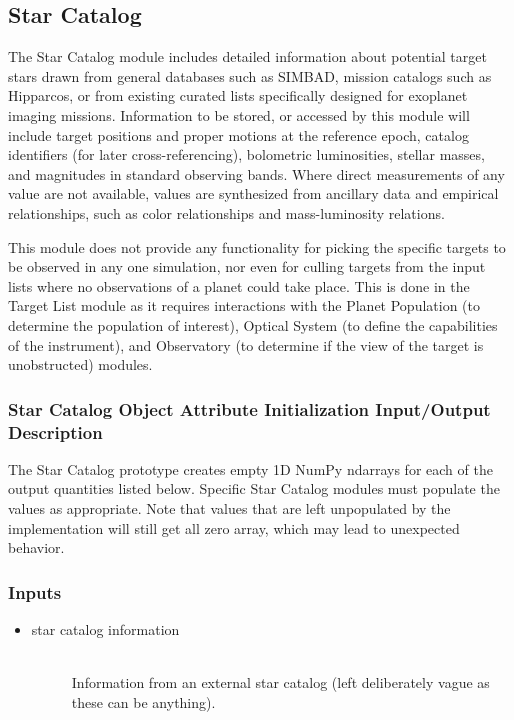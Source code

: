 \documentclass[cleanfoot]{asme2ej}
\begin{document}

\subsection{Star Catalog} \label{sec:starcatalog}
The Star Catalog module includes detailed information about potential target stars drawn from general databases such as SIMBAD, mission catalogs such as Hipparcos, or from existing curated lists specifically designed for exoplanet imaging missions.  Information to be stored, or accessed by this module will include target positions and proper motions at the reference epoch, catalog identifiers (for later cross-referencing), bolometric luminosities, stellar masses, and magnitudes in standard observing bands.  Where direct measurements of any value are not available, values are synthesized from ancillary data and empirical relationships, such as color relationships and mass-luminosity relations.

This module does not provide any functionality for picking the specific targets to be observed in any one simulation, nor even for culling targets from the input lists where no observations of a planet could take place.  This is done in the Target List module as it requires interactions with the Planet Population (to determine the population of interest), Optical System (to define the capabilities of the instrument), and Observatory (to determine if the view of the target is unobstructed) modules.

\subsubsection{Star Catalog Object Attribute Initialization Input/Output Description} 
The Star Catalog prototype creates empty 1D NumPy ndarrays for each of the output quantities listed below.  Specific Star Catalog modules must populate the values as appropriate.  Note that values that are left unpopulated by the implementation will still get all zero array, which may lead to unexpected behavior.

\subsubsection*{Inputs}
\begin{itemize}
    \item 
    \begin{description}
        \item[star catalog information] \hfill \\
        Information from an external star catalog (left deliberately vague as these can be anything).
    \end{description}
\end{itemize}
\end{document}
